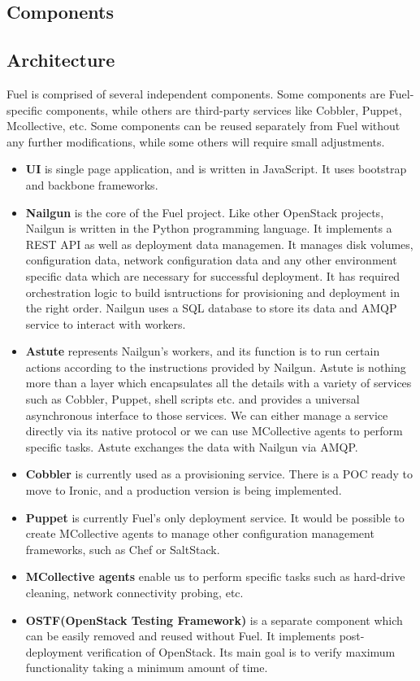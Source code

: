 \documentclass[a4paper, 12pt]{article}
\begin{document}
\subsection{Components}

\subsection{Architecture}
Fuel is comprised of several independent components. Some components are Fuel-specific components, while others are third-party services like Cobbler, Puppet, Mcollective, etc. Some components can be reused separately from Fuel without any further modifications, while some others will require small adjustments.
\begin{itemize}
\item
\textbf{UI} is single page application, and is written in JavaScript. It uses bootstrap and backbone frameworks.
\item
\textbf{Nailgun} is the core of the Fuel project. Like other OpenStack projects, Nailgun is written in the Python programming language. It implements a REST API as well as deployment data managemen. It manages disk volumes, configuration data, network configuration data and any other environment specific data which are necessary for successful deployment. It has required orchestration logic to build isntructions for provisioning and deployment in the right order. Nailgun uses a SQL database to store its data and AMQP service to interact with workers. 
\item
\textbf{Astute} represents Nailgun's workers, and its function is to run certain actions according to the instructions provided by Nailgun. Astute is nothing more than a layer which encapsulates all the details with a variety of services such as Cobbler, Puppet, shell scripts etc. and provides a universal asynchronous interface to those services. We can either manage a service directly via its native protocol or we can use MCollective agents to perform specific tasks. Astute exchanges the data with Nailgun via AMQP. 
\item
\textbf{Cobbler} is currently used as a provisioning service. There is a POC ready to move to Ironic, and a production version is being implemented. 
\item
\textbf{Puppet} is currently Fuel's only deployment service. It would be possible to create MCollective agents to manage other configuration management frameworks, such as Chef or SaltStack. 
\item
\textbf{MCollective agents} enable us to perform specific tasks such as hard-drive cleaning, network connectivity probing, etc. 
\item
\textbf{OSTF(OpenStack Testing Framework)} is a separate component which can be easily removed and reused without Fuel. It implements post-deployment verification of OpenStack. Its main goal is to verify maximum functionality taking a minimum amount of time.
\end{itemize}
\end{document}
